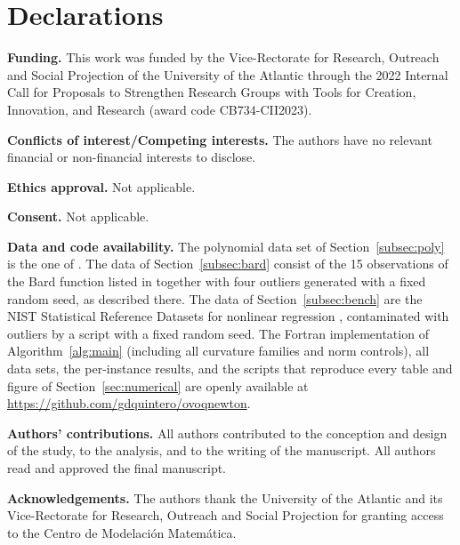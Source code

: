 \documentclass[11pt]{article}
\newcounter{alg}[section]
\begin{document}
\section*{Declarations}

\medskip
\noindent
\textbf{Funding.} This work was funded by the Vice-Rectorate for Research, Outreach and Social Projection of the University of the Atlantic through the 2022 Internal Call for Proposals to Strengthen Research Groups with Tools for Creation, Innovation, and Research (award code CB734-CII2023).

\medskip
\noindent
\textbf{Conflicts of interest/Competing interests.} The authors have no relevant financial or non-financial interests to disclose.

\medskip
\noindent
\textbf{Ethics approval.} Not applicable.

\medskip
\noindent
\textbf{Consent.} Not applicable.

\medskip
\noindent
\textbf{Data and code availability.} The polynomial data set of Section~\ref{subsec:poly} is the one of \cite{dunder1}. The data of Section~\ref{subsec:bard} consist of the 15 observations of the Bard function listed in \cite{mgh} together with four outliers generated with a fixed random seed, as described there. The data of Section~\ref{subsec:bench} are the NIST Statistical Reference Datasets for nonlinear regression \cite{nist}, contaminated with outliers by a script with a fixed random seed. The Fortran implementation of Algorithm~\ref{alg:main} (including all curvature families and norm controls), all data sets, the per-instance results, and the scripts that reproduce every table and figure of Section~\ref{sec:numerical} are openly available at \url{https://github.com/gdquintero/ovoqnewton}.

\medskip
\noindent
\textbf{Authors' contributions.} All authors contributed to the conception and design of the study, to the analysis, and to the writing of the manuscript. All authors read and approved the final manuscript.

\medskip
\noindent
\textbf{Acknowledgements.} The authors thank the University of the Atlantic and its Vice-Rectorate for Research, Outreach and Social Projection for granting access to the Centro de Modelación Matemática.

\clearpage
\end{document}
